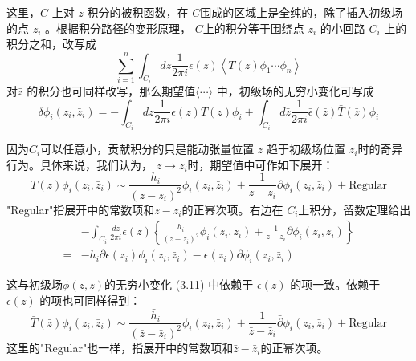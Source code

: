 这里，$ C$ 上对 $z$ 积分的被积函数，在 $C $围成的区域上是全纯的，除了插入初级场的点 $z_i$ 。根据积分路径的变形原理， $C $上的积分等于围绕点 $z_i$ 的小回路 $C_i$ 上的积分之和，改写成
\[
\sum_{i=1}^{n} \int_{C_{i}} d z \frac{1}{2 \pi i} \epsilon(z)\left\langle T(z) \phi_{1} \cdots \phi_{n}\right\rangle
\]
对$ \bar{z}$ 的积分也可同样改写，那么期望值$ \langle \cdots \rangle$ 中，初级场的无穷小变化可写成
\begin{equation}
	\delta \phi_{i}\left(z_{i}, \bar{z}_{i}\right)=-\int_{C_{i}} d z \frac{1}{2 \pi i} \epsilon(z) T(z) \phi_{i}+\int_{C_{i}} d \bar{z} \frac{1}{2 \pi i} \bar{\epsilon}(\bar{z}) \bar{T}(\bar{z}) \phi_{i}
\end{equation}

因为$ C_i $可以任意小，贡献积分的只是能动张量位置 $z$ 趋于初级场位置 $z_i $时的奇异行为。具体来说，我们认为， $z\to z_i $时，期望值中可作如下展开：
\begin{equation}
T(z) \phi_{i}\left(z_{i}, \bar{z}_{i}\right)\sim\frac{h_{i}}{\left(z-z_{i}\right)^{2}} \phi_{i}\left(z_{i}, \bar{z}_{i}\right)+\frac{1}{z-z_{i}} \partial \phi_{i}\left(z_{i}, \bar{z}_{i}\right)+\text{Regular}
\end{equation}
"Regular"指展开中的常数项和$z-z_i $的正幂次项。右边在 $C_i $上积分，留数定理给出
\begin{equation}
\begin{aligned} &-\int_{C_{i}} \frac{d z}{2 \pi i} \epsilon(z)\left\{\frac{h_{i}}{\left(z-z_{i}\right)^{2}} \phi_{i}\left(z_{i}, \bar{z}_{i}\right)+\frac{1}{z-z_{i}} \partial \phi_{i}\left(z_{i}, \bar{z}_{i}\right)\right\} \\ =&-h_{i} \partial \epsilon\left(z_{i}\right) \phi_{i}\left(z_{i}, \bar{z}_{i}\right)-\epsilon\left(z_{i}\right) \partial \phi_{i}\left(z_{i}, \bar{z}_{i}\right) \end{aligned}
\end{equation}

这与初级场$ \phi(z,\bar{z}) $的无穷小变化 (3.11) 中依赖于 $\epsilon(z)$ 的项一致。依赖于 $\bar{\epsilon}(\bar{z})$ 的项也可同样得到：
\begin{equation}
\bar{T}(\bar{z}) \phi_{i}\left(z_{i}, \bar{z}_{i}\right) \sim \frac{\bar{h}_{i}}{\left(\bar{z}-\bar{z}_{i}\right)^{2}} \phi_{i}\left(z_{i}, \bar{z}_{i}\right)+\frac{1}{\bar{z}-\bar{z}_{i}} \bar{\partial} \phi_{i}\left(z_{i}, \bar{z}_{i}\right)+\text{Regular}
\end{equation}
这里的"Regular"也一样，指展开中的常数项和$ \bar{z}-\bar{z}_i $的正幂次项。


